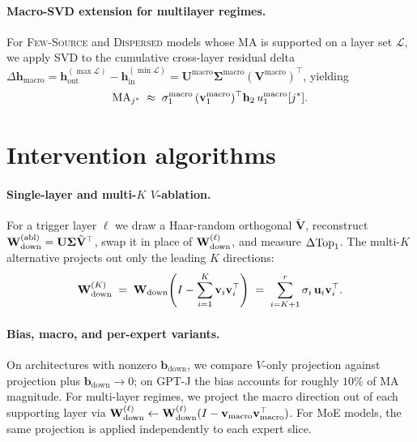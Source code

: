 \paragraph{Macro-SVD extension for multilayer regimes.}
For \textsc{Few-Source} and \textsc{Dispersed} models whose MA is supported
on a layer set $\mathcal{L}$, we apply SVD to the cumulative cross-layer
residual delta
$\Delta\mathbf{h}_{\text{macro}} = \mathbf{h}^{(\max\mathcal{L})}_{\text{out}} - \mathbf{h}^{(\min\mathcal{L})}_{\text{in}} = \mathbf{U}^{\text{macro}}\boldsymbol{\Sigma}^{\text{macro}}(\mathbf{V}^{\text{macro}})^{\top}$,
yielding
\begin{equation}
  \label{eq:ma-macro-app}
  \mathrm{MA}_{j^{*}} \;\approx\; \sigma_1^{\text{macro}}\,(\mathbf{v}_1^{\text{macro}})^{\top}\mathbf{h}_2\,u_1^{\text{macro}}[j^{*}].
\end{equation}

\section{Intervention algorithms}
\label{app:interventions}

\paragraph{Single-layer and multi-$K$ $V$-ablation.}
For a trigger layer $\ell$ we draw a Haar-random orthogonal
$\tilde{\mathbf{V}}$, reconstruct
$\mathbf{W}_{\text{down}}^{(\text{abl})} = \mathbf{U}\boldsymbol{\Sigma}\tilde{\mathbf{V}}^{\top}$,
swap it in place of $\mathbf{W}_{\text{down}}^{(\ell)}$, and measure $\Delta\mathrm{Top}_1$. The
multi-$K$ alternative projects out only the leading $K$ directions:
\begin{equation}
  \label{eq:multi-k-app}
  \mathbf{W}_{\text{down}}^{(K)} \;=\; \mathbf{W}_{\text{down}}\!\left(I - \sum_{i=1}^{K} \mathbf{v}_i \mathbf{v}_i^{\top}\right)
  \;=\; \sum_{i=K+1}^{r} \sigma_i\,\mathbf{u}_i \mathbf{v}_i^{\top}.
\end{equation}

\paragraph{Bias, macro, and per-expert variants.}
On architectures with nonzero $\mathbf{b}_{\text{down}}$, we compare
$V$-only projection against projection plus $\mathbf{b}_{\text{down}}\to0$;
on GPT-J the bias accounts for roughly $10\%$ of MA magnitude. For
multi-layer regimes, we project the macro direction out of each supporting
layer via
$\mathbf{W}_{\text{down}}^{(\ell)} \leftarrow \mathbf{W}_{\text{down}}^{(\ell)}(I - \mathbf{v}_{\text{macro}}\mathbf{v}_{\text{macro}}^{\top})$.
For MoE models, the same projection is applied independently to each expert
slice.

